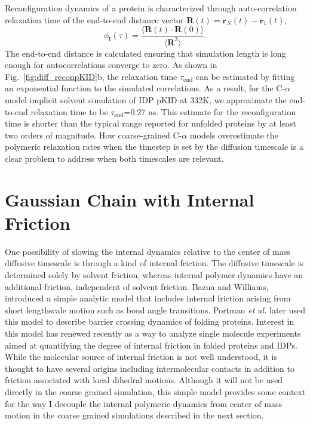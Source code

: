 \documentclass[../talant.diss.submit.tex]{subfiles}
\begin{document}
Reconfiguration dynamics of a protein is characterized through auto-correlation
relaxation time of the end-to-end distance vector $\bm{R}(t) = \bm{r}_N(t) - \bm{r}_1(t)$,
%
%
\begin{equation}
  \label{eq:autocorr_end}
  \phi_{\mathrm{I}}(\tau) = \frac{\langle \bm{R}(t) \cdot \bm{R}(0) \rangle}{\langle \bm{R}^2 \rangle}.  
\end{equation}
%
%
The end-to-end distance is calculated ensuring that simulation length is long enough for
autocorrelations converge to zero. As shown in Fig.~\ref{fig:diff_reconpKID}b,
the relaxation time $\tau_{\mathrm{end}}$ can be estimated by fitting an exponential function
to the simulated correlations. As a result, for the C-$\alpha$ model implicit
solvent simulation of IDP pKID at 332K, we approximate the end-to-end relaxation time
to be $\tau_{\mathrm{end}}$=0.27 ns. This estimate for the reconfiguration
time is shorter than the typical range reported for unfolded proteins by at least
two orders of magnitude. 
How coarse-grained C-$\alpha$ models overestimate the polymeric
relaxation rates when the timestep is set by the diffusion timescale is a clear problem
to address when both timescales are relevant. 



\section{\textbf{Gaussian Chain with Internal Friction}}\label{sect:gaussian_chain}
One possibility of slowing the internal dynamics relative to the
center of mass diffusive timescale is through a kind of internal friction.
The diffusive timescale is determined
solely by solvent friction, whereas internal polymer dynamics have an additional
friction, independent of solvent friction. Bazua and Williams,\cite{bazua:73} introduced a 
simple analytic model that includes internal friction arising from short lengthscale
motion such as bond angle transitions. Portman
\textit{et al.} later used this model to describe barrier crossing dynamics of folding
proteins.\cite{portman:01a} Interest in this model has renewed recently
\cite{khatri:07,cheng:13,Samanta:2014,Yu:2015,Samanta:2016,Zheng:2018b}
as a way to analyze single molecule experiments
aimed at quantifying the degree of internal friction in folded proteins and
IDPs.\cite{soranno:12,Schuler:2016,Soranno:2017} While the molecular source of internal friction is not
well understood, it is thought to have several origins including  intermolecular
contacts in addition to friction
associated with local dihedral motions.\cite{echeverria:14,Zheng:2018b} Although it will not be used directly
in the coarse grained simulation, this simple model provides some
context for the way I decouple the internal polymeric dynamics from center of
mass motion in the coarse grained simulations described in the next section.
\end{document}
